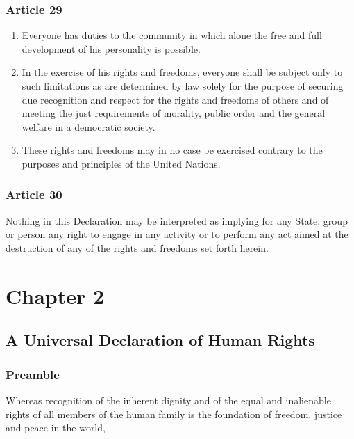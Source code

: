 \documentclass[
  ngerman,
  american,
  titlepage,
  openright,
  DIV=calc,
  toc=listof,
  listof=nochaptergap]{scrbook}
\begin{document}
\subsection{Article 29}\label{article-29}

\begin{enumerate}
\def\labelenumi{\arabic{enumi}.}
\item
  Everyone has duties to the community in which alone the free and full
  development of his personality is possible.
\item
  In the exercise of his rights and freedoms, everyone shall be subject
  only to such limitations as are determined by law solely for the
  purpose of securing due recognition and respect for the rights and
  freedoms of others and of meeting the just requirements of morality,
  public order and the general welfare in a democratic society.
\item
  These rights and freedoms may in no case be exercised contrary to the
  purposes and principles of the United Nations.
\end{enumerate}

\subsection{Article 30}\label{article-30}

Nothing in this Declaration may be interpreted as implying for any
State, group or person any right to engage in any activity or to perform
any act aimed at the destruction of any of the rights and freedoms set
forth herein.

\chapter{Chapter 2}\label{sec-chapter2}

\section{A Universal Declaration of Human
Rights}\label{a-universal-declaration-of-human-rights-1}

\subsection{Preamble}\label{preamble-1}

Whereas recognition of the inherent dignity and of the equal and
inalienable rights of all members of the human family is the foundation
of freedom, justice and peace in the world,
\end{document}
